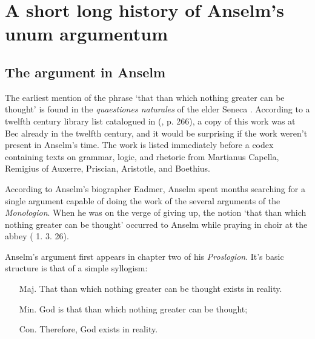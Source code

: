 \documentclass[]{birkjour}
\begin{document}
\section{A short long history of Anselm's unum argumentum}
\subsection{The argument in Anselm}
The earliest mention of the phrase `that than which nothing greater can be thought' is found in the \textit{quaestiones naturales} of the elder Seneca \cite{SenecaQN}. According to a twelfth century library list catalogued in (\cite{Bekker1885}, p. 266), a copy of this work was at Bec already in the twelfth century, and it would be surprising if the work weren't present in Anselm's time. The work is listed immediately before a codex containing texts on grammar, logic, and rhetoric from Martianus Capella, Remigius of Auxerre, Priscian, Aristotle, and Boethius.

According to Anselm's biographer Eadmer, Anselm spent months searching for a single argument capable of doing the work of the several arguments of the \textit{Monologion}. When he was on the verge of giving up, the notion `that than which nothing greater can be thought' occurred to Anselm while praying in choir at the abbey (\cite{VA} 1. 3. 26).

Anselm's argument first appears in chapter two of his \textit{Proslogion}. It's basic structure is that of a simple syllogism:
\begin{enumerate}
\item[Maj.] That than which nothing greater can be thought exists in reality.
\item[Min.] God is that than which nothing greater can be thought;
\item[Con.] Therefore, God exists in reality.
\end{enumerate}
\end{document}

